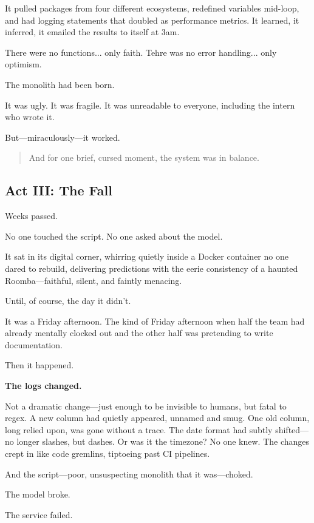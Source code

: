 It pulled packages from four different ecosystems, redefined variables mid-loop, and had logging statements that doubled as performance metrics. It learned, it inferred, it emailed the results to itself at 3am.

There were no functions... only faith.  
Tehre was no error handling... only optimism.

The monolith had been born.

It was ugly. It was fragile. It was unreadable to everyone, including the intern who wrote it.

But—miraculously—it worked.

\begin{quote}
And for one brief, cursed moment, the system was in balance.
\end{quote}



\vspace{1em}
\subsection{Act III: The Fall}

Weeks passed.

No one touched the script. No one asked about the model.

It sat in its digital corner, whirring quietly inside a Docker container no one dared to rebuild, delivering predictions with the eerie consistency of a haunted Roomba—faithful, silent, and faintly menacing.

Until, of course, the day it didn’t.

It was a Friday afternoon. The kind of Friday afternoon when half the team had already mentally clocked out and the other half was pretending to write documentation.

Then it happened.

\textbf{The logs changed.}

Not a dramatic change—just enough to be invisible to humans, but fatal to regex. A new column had quietly appeared, unnamed and smug. One old column, long relied upon, was gone without a trace. The date format had subtly shifted—no longer slashes, but dashes. Or was it the timezone? No one knew. The changes crept in like code gremlins, tiptoeing past CI pipelines.

And the script—poor, unsuspecting monolith that it was—choked.

The model broke.

The service failed.

